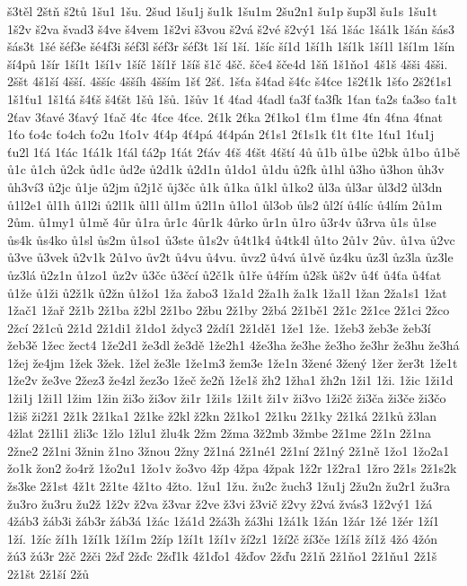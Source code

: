{š3těl
2štň
š2tů
1šu1
1šu.
2šud
1šu1j
šu1k
1šu1m
2šu2n1
šu1p
šup3l
šu1s
1šu1t
1š2v
š2va
švad3
š4ve
š4vem
1š2vi
š3vou
š2vá
š2vé
š2vý1
1šá
1šác
1šá1k
1šán
šás3
šás3t
1šé
šéf3e
šé4f3i
šéf3l
šéf3r
šéf3t
1ší
1ší.
1šíc
ší1d
1ší1h
1ší1k
1ší1l
1ší1m
1šín
ší4pů
1šír
1ší1t
1ší1v
1šíč
1ší1ř
1šíš
š1č
4šč.
šče4
šče4d
1šň
1š1ňo1
4š1š
4šši
4šši.
2ššt
4š1ší
4šší.
4ššíc
4ššíh
4šším
1šť
2šť.
1šťa
š4ťad
š4ťc
š4ťce
1š2ť1k
1šťo
2š2ť1s1
1š1ťu1
1š1ťá
š4ťš
š4ťšt
1šů
1šů.
1šův
1ť
4ťad
4ťadl
ťa3f
ťa3fk
1ťan
ťa2s
ťa3so
ťa1t
2ťav
3ťavé
3ťavý
1ťač
4ťc
4ťce
4ťce.
2ť1k
2ťka
2ť1ko1
ť1m
ť1me
4ťn
4ťna
4ťnat
1ťo
ťo4c
ťo4ch
ťo2u
1ťo1v
4ť4p
4ť4pá
4ť4pán
2ť1s1
2ť1s1k
ť1t
ť1te
1ťu1
1ťu1j
ťu2l
1ťá
1ťác
1ťá1k
1ťál
ťá2p
1ťát
2ťáv
4ťš
4ťšt
4ťští
4ů
ů1b
ů1be
ů2bk
ů1bo
ů1bě
ů1c
ů1ch
ů2ck
ůd1c
ůd2e
ů2d1k
ů2d1n
ů1do1
ů1du
ů2fk
ů1hl
ů3ho
ů3hon
ůh3v
ůh3ví3
ů2jc
ů1je
ů2jm
ů2j1č
ůj3čc
ů1k
ů1ka
ů1kl
ů1ko2
ůl3a
ůl3ar
ůl3d2
ůl3dn
ů1l2e1
ůl1h
ů1l2i
ů2l1k
ůl1l
ůl1m
ů2l1n
ů1lo1
ůl3ob
ůls2
ůl2í
ů4líc
ů4lím
2ů1m
2ům.
ů1my1
ů1mě
4ůr
ů1ra
ůr1c
4ůr1k
4ůrko
ůr1n
ů1ro
ů3r4v
ů3rva
ů1s
ů1se
ůs4k
ůs4ko
ů1sl
ůs2m
ů1so1
ů3ste
ů1s2v
ů4t1k4
ů4tk4l
ů1to
2ů1v
2ův.
ů1va
ů2vc
ů3ve
ů3vek
ů2v1k
2ů1vo
ův2t
ů4vu
ů4vu.
ůvz2
ů4vá
ů1vě
ůz4ku
ůz3l
ůz3la
ůz3le
ůz3lá
ů2z1n
ů1zo1
ůz2v
ů3čc
ů3čcí
ů2č1k
ů1ře
ů4řím
ů2šk
ůš2v
ů4ť
ů4ťa
ů4ťat
ů1že
ů1ži
ů2ž1k
ů2žn
ů1žo1
1ža
žabo3
1ža1d
2ža1h
ža1k
1ža1l
1žan
2ža1s1
1žat
1žač1
1žař
2ž1b
2ž1ba
ž2bl
2ž1bo
2žbu
2ž1by
2žbá
2ž1bě1
2ž1c
2ž1ce
2ž1ci
2žco
2žcí
2ž1ců
2ž1d
2ž1di1
ž1do1
ždyc3
2ždí1
2ž1dě1
1že1
1že.
1žeb3
žeb3e
žeb3í
žeb3ě
1žec
žect4
1že2d1
že3dl
že3dě
1že2h1
4že3ha
že3he
že3ho
že3hr
že3hu
že3há
1žej
že4jm
1žek
3žek.
1žel
že3le
1že1m3
žem3e
1že1n
3žené
3žený
1žer
žer3t
1že1t
1že2v
že3ve
2žez3
že4zl
žez3o
1žeč
že2ň
1že1š
žh2
1žha1
žh2n
1ži1
1ži.
1žic
1ži1d
1ži1j
1ži1l
1žim
1žin
ži3o
ži3ov
ži1r
1ži1s
1ži1t
ži1v
ži3vo
1ži2č
ži3ča
ži3če
ži3čo
1žiš
ži2ž1
2ž1k
2ž1ka1
2ž1ke
ž2kl
ž2kn
2ž1ko1
2ž1ku
2ž1ky
2ž1ká
2ž1ků
ž3lan
4žlat
2ž1li1
žli3c
1žlo
1žlu1
žlu4k
2žm
2žma
3ž2mb
3žmbe
2ž1me
2ž1n
2ž1na
2žne2
2ž1ni
3žnin
ž1no
3žnou
2žny
2ž1ná
2ž1né1
2ž1ní
2ž1ný
2ž1ně
1žo1
1žo2a1
žo1k
žon2
žo4rž
1žo2u1
1žo1v
žo3vo
4žp
4žpa
4žpak
1ž2r
1ž2ra1
1žro
2ž1s
2ž1s2k
žs3ke
2ž1st
4ž1t
2ž1te
4ž1to
4žto.
1žu1
1žu.
žu2c
žuch3
1žu1j
2žu2n
žu2r1
žu3ra
žu3ro
žu3ru
žu2ž
1ž2v
ž2va
ž3var
ž2ve
ž3vi
ž3vič
ž2vy
ž2vá
žvás3
1ž2vý1
1žá
4žáb3
žáb3i
žáb3r
žáb3á
1žác
1žá1d
2žá3h
žá3hi
1žá1k
1žán
1žár
1žé
1žér
1ží1
1ží.
1žíc
ží1h
1ží1k
1ží1m
2žíp
1ží1t
1ží1v
ží2z1
1ží2č
ží3če
1ží1š
ží1ž
4žó
4žón
žú3
žú3r
2žč
2žči
2žď
2žďc
2žď1k
4ž1ďo1
4žďov
2žďu
2ž1ň
2ž1ňo1
2ž1ňu1
2ž1š
2ž1št
2ž1ší
2žů
}
